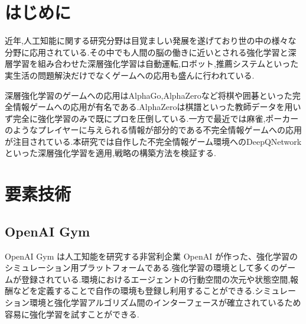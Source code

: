\documentclass[twocolumn]{jarticle}     %
\begin{document}

\section{はじめに}
近年,人工知能に関する研究分野は目覚ましい発展を遂げており世の中の様々な分野に応用されている.その中でも人間の脳の働きに近いとされる強化学習と深層学習を組み合わせた深層強化学習は自動運転,ロボット,推薦システムといった実生活の問題解決だけでなくゲームへの応用も盛んに行われている.
\par
深層強化学習のゲームへの応用はAlphaGo,AlphaZeroなど将棋や囲碁といった完全情報ゲームへの応用が有名である.AlphaZeroは棋譜といった教師データを用いず完全に強化学習のみで既にプロを圧倒している.一方で最近では麻雀,ポーカーのようなプレイヤーに与えられる情報が部分的である不完全情報ゲームへの応用が注目されている.本研究では自作した不完全情報ゲーム環境へのDeepQNetworkといった深層強化学習を適用,戦略の構築方法を検証する.

\section{要素技術}

\subsection{OpenAI Gym}
OpenAI Gym は人工知能を研究する非営利企業 OpenAI が作った、強化学習のシミュレーション用プラットフォームである.強化学習の環境として多くのゲームが登録されている.環境におけるエージェントの行動空間の次元や状態空間,報酬などを定義することで自作の環境も登録し利用することができる.シミュレーション環境と強化学習アルゴリズム間のインターフェースが確立されているため容易に強化学習を試すことができる.
\end{document}
